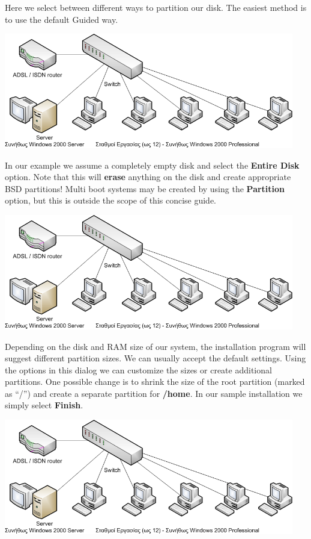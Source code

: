 \documentclass[a4paper,twoside,12pt]{article}
\begin{document}
Here we select between different ways to partition our disk. The easiest method is to use the default Guided way.

\begin{center}
\includegraphics[width=0.95\textwidth]{images/main/school-lab}
\end{center}

In our example we assume a completely empty disk and select the \textbf{Entire Disk} option. Note that this will \textbf{erase} anything on the disk and create appropriate BSD partitions! Multi boot systems may be created by using the \textbf{Partition} option, but this is outside the scope of this concise guide.

\begin{center}
\includegraphics[width=0.95\textwidth]{images/main/school-lab}
\end{center}

Depending on the disk and RAM size of our system, the installation program will suggest different partition sizes. We can usually accept the default settings. Using the options in this dialog we can customize the sizes or create additional partitions. One possible change is to shrink the size of the root partition (marked as ``/'') and create a separate partition for \textbf{/home}. In our sample installation we simply select \textbf{Finish}.

\begin{center}
\includegraphics[width=0.95\textwidth]{images/main/school-lab}
\end{center}
\end{document}
